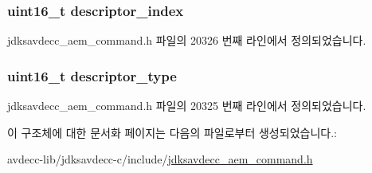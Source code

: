 \subsubsection[{\texorpdfstring{descriptor\+\_\+index}{descriptor_index}}]{\setlength{\rightskip}{0pt plus 5cm}uint16\+\_\+t descriptor\+\_\+index}\hypertarget{structjdksavdecc__aem__command__set__mixer_a042bbc76d835b82d27c1932431ee38d4}{}\label{structjdksavdecc__aem__command__set__mixer_a042bbc76d835b82d27c1932431ee38d4}


jdksavdecc\+\_\+aem\+\_\+command.\+h 파일의 20326 번째 라인에서 정의되었습니다.

\subsubsection[{\texorpdfstring{descriptor\+\_\+type}{descriptor_type}}]{\setlength{\rightskip}{0pt plus 5cm}uint16\+\_\+t descriptor\+\_\+type}\hypertarget{structjdksavdecc__aem__command__set__mixer_ab7c32b6c7131c13d4ea3b7ee2f09b78d}{}\label{structjdksavdecc__aem__command__set__mixer_ab7c32b6c7131c13d4ea3b7ee2f09b78d}


jdksavdecc\+\_\+aem\+\_\+command.\+h 파일의 20325 번째 라인에서 정의되었습니다.



이 구조체에 대한 문서화 페이지는 다음의 파일로부터 생성되었습니다.\+:\begin{DoxyCompactItemize}
\item 
avdecc-\/lib/jdksavdecc-\/c/include/\hyperlink{jdksavdecc__aem__command_8h}{jdksavdecc\+\_\+aem\+\_\+command.\+h}\end{DoxyCompactItemize}

